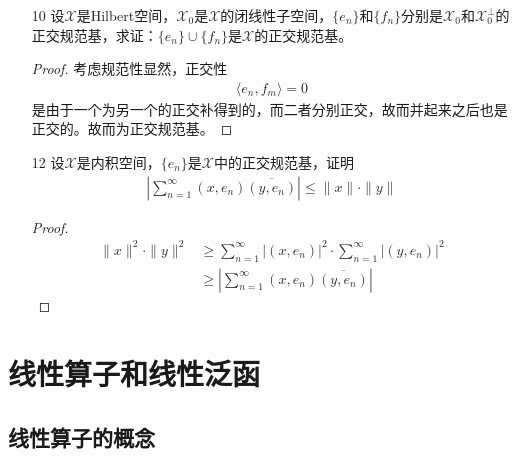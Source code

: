 \begin{enumerate}[leftmargin=2cm, label=\arabic*]
		\item[10] 设$\mathscr{X}$是Hilbert空间，$\mathscr{X}_0$是$\mathscr{X}$的闭线性子空间，$\{e_n\}$和$\{f_n\}$分别是$\mathscr{X}_0$和$\mathscr{X}_0^{\perp}$的正交规范基，求证：$\{e_n\}\cup\{f_n\}$是$\mathscr{X}$的正交规范基。
		\begin{proof}
			考虑规范性显然，正交性
			\begin{align*}
				\langle e_n, f_m\rangle = 0
			\end{align*}
			是由于一个为另一个的正交补得到的，而二者分别正交，故而并起来之后也是正交的。故而为正交规范基。
		\end{proof}
		
		\item[12] 设$\mathscr{X}$是内积空间，$\{e_n\}$是$\mathscr{X}$中的正交规范基，证明
		\begin{align*}
			\left|\sum\limits_{n=1}^{\infty} (x,e_n) \overline{(y,e_n)} \right| \leqslant \|x\| \cdot \|y\|
		\end{align*}
		\begin{proof}
			\begin{align*}
				\|x\|^2 \cdot \|y\|^2 &\geqslant \sum\limits_{n=1}^{\infty} |(x,e_n)|^2 \cdot \sum\limits_{n=1}^{\infty} |(y,e_n)|^2 \\
				& \geqslant \left|\sum\limits_{n=1}^{\infty} (x,e_n) \overline{(y,e_n)} \right| 
			\end{align*}
		\end{proof}
	\end{enumerate}
	
	
	\chapter{线性算子和线性泛函}
	
	\section{线性算子的概念}
